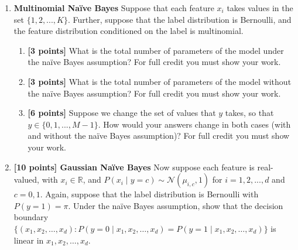 \begin{enumerate}
    \item \textbf{Multinomial Na\"{i}ve Bayes} Suppose that each feature $x_i$ takes values in the set $\{1,2,...,K\}$. Further, suppose that the label distribution is Bernoulli, and the feature distribution conditioned on the label is multinomial. 
    \begin{enumerate}
        \item \textbf{[3 points]} What is the total number of parameters of the model under the na\"{i}ve Bayes assumption? For full credit you must show your work.
    
        \begin{tcolorbox}[fit,height=3cm, width=0.85\textwidth, blank, borderline={1pt}{-2pt}]
        \end{tcolorbox}
        
    \item\textbf{[3 points]} What is the total number of parameters of the model without the na\"{i}ve Bayes assumption? For full credit you must show your work.
    
        \begin{tcolorbox}[fit,height=3cm, width=0.85\textwidth, blank, borderline={1pt}{-2pt}]
        \end{tcolorbox}
        
    \item \textbf{[6 points]} Suppose we change the set of values that $y$ takes, so that $y\in \{0, 1, ..., M-1\}$. How would your answers change in both cases (with and without the na\"{i}ve Bayes assumption)? For full credit you must show your work.
    
        \begin{tcolorbox}[fit,height=5cm, width=0.85\textwidth, blank, borderline={1pt}{-2pt}]
        \end{tcolorbox}
        
    \end{enumerate}
    
    \newpage
    
    \item \textbf{[10 points] Gaussian Na\"{i}ve  Bayes} Now suppose each feature is real-valued, with $x_i \in \mathbb{R}$, and $P(x_i \mid y=c)\sim \mathcal{N}(\mu_{i,c}, 1)$ for $i=1,2,...,d$ and $c=0,1$. Again, suppose that the label distribution is Bernoulli with $P(y = 1) = \pi$. Under the na\"{i}ve Bayes assumption, show that the decision boundary $\{(x_1, x_2, \dots, x_d): P(y=0 \mid x_1, x_2, \dots, x_d) = P(y=1 \mid x_1, x_2, \dots, x_d)\}$ is linear in $x_1, x_2, \dots, x_d$.
    

\end{enumerate}
